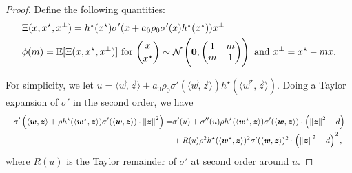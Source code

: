 \begin{proof}
Define the following quantities:
\begin{align}
  &\Xi(x, x^\star, x^\bot) = h^\star(x^\star) \sigma'(x + a_0\rho_0 \sigma'(x) h^\star(x^\star)) x^\bot \\
  &\phi(m) = \mathbb{E}[\Xi(x, x^\star, x^\bot)] \  \text{for} \  \dbinom{x}{x^\star} \sim  \mathcal{N}\left( {\boldsymbol{0}},
    \begin{pmatrix}
      1 & m \\
      m & 1
  \end{pmatrix} \right) \  \text{and} \  x^\bot = x^\star - m x.\label{2405:eq:app:def_phi}
\end{align}

  For simplicity, we let $u = \langle \vec{w}, \vec{z} \rangle + a_0\rho_0 \sigma'(\langle \vec{w}, \vec{z} \rangle) h^\star(\langle \vec{w}^\star, \vec{z} \rangle)$. Doing a Taylor expansion of $\sigma'$ in the second order, we have
  \[
    \resizebox{\linewidth}{!}{$\displaystyle
      \begin{aligned}
        \sigma'\left(\langle \vec{w}, \vec{z} \rangle + \rho h^\star(\langle \vec{w}^\star, \vec{z} \rangle) \sigma'(\langle \vec{w}, \vec{z} \rangle) \cdot \norm{\vec{z}}^2\right) = &\sigma'(u)
        + \sigma''(u) \rho h^\star(\langle \vec{w}^\star, \vec{z} \rangle) \sigma'(\langle \vec{w}, \vec{z} \rangle) \cdot  \left(\norm{\vec{z}}^2 - d \right) \\
        &+ R(u) \rho^2 h^\star(\langle \vec{w}^\star, \vec{z} \rangle)^2 \sigma'(\langle \vec{w}, \vec{z} \rangle)^2 \cdot  \left(\norm{\vec{z}}^2 - d \right)^2 ,
      \end{aligned}
    $}
  \]
  where $R(u)$ is the Taylor remainder of $\sigma'$ at second order around $u$.


\end{proof}
